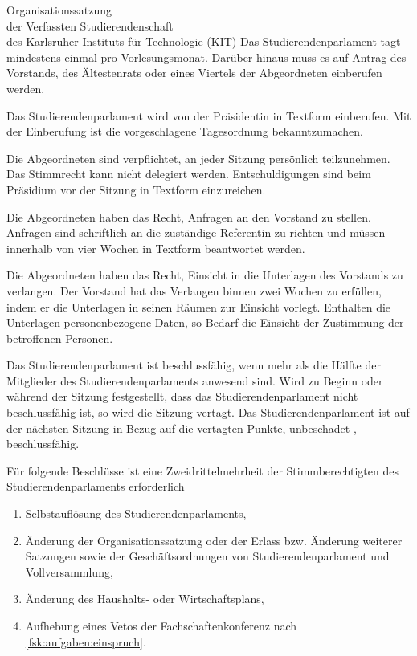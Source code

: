 \begin{jurdoc}[Organisationssatzung]{Organisationssatzung\\der Verfassten Studierendenschaft\\des Karlsruher Instituts für Technologie (KIT)}
Das Studierendenparlament tagt mindestens einmal pro Vorlesungsmonat. Darüber hinaus muss es auf Antrag des Vorstands, des Ältestenrats oder eines Viertels der Abgeordneten einberufen werden.

Das Studierendenparlament wird von der Präsidentin in Textform einberufen. Mit der Einberufung ist die vorgeschlagene Tagesordnung bekanntzumachen.

Die Abgeordneten sind verpflichtet, an jeder Sitzung persönlich teilzunehmen. Das Stimmrecht kann nicht delegiert werden. Entschuldigungen sind beim Präsidium vor der Sitzung in Textform einzureichen.

Die Abgeordneten haben das Recht, Anfragen an den Vorstand zu stellen. Anfragen sind schriftlich an die zuständige Referentin zu richten und müssen innerhalb von vier Wochen in Textform beantwortet werden.

Die Abgeordneten haben das Recht, Einsicht in die Unterlagen des Vorstands zu verlangen. Der Vorstand hat das Verlangen binnen zwei Wochen zu erfüllen, indem er die Unterlagen in seinen Räumen zur Einsicht vorlegt. Enthalten die Unterlagen personenbezogene Daten, so Bedarf die Einsicht der Zustimmung der betroffenen Personen.


\label{stupa:beschluesse}

Das Studierendenparlament ist beschlussfähig, wenn mehr als die Hälfte der Mitglieder des Studierendenparlaments anwesend sind. Wird zu Beginn oder während der Sitzung festgestellt, dass das Studierendenparlament nicht beschlussfähig ist, so wird die Sitzung vertagt. Das Studierendenparlament ist auf der nächsten Sitzung in Bezug auf die vertagten Punkte, unbeschadet , beschlussfähig.

Für folgende Beschlüsse ist eine Zweidrittelmehrheit der Stimmberechtigten des Studierendenparlaments erforderlich \label{stupa:beschluesse:zweidrittel}
\begin{enumerate}
  \item Selbstauflösung des Studierendenparlaments,
  \item Änderung der Organisationssatzung oder der Erlass bzw. Änderung weiterer Satzungen sowie der Ge\-schäfts\-ord\-nungen von Studierendenparlament und Vollversammlung,
  \item Änderung des Haushalts- oder Wirtschaftsplans,
  \item Aufhebung eines Vetos der Fachschaftenkonferenz nach \ref{fsk:aufgaben:einspruch}.
\end{enumerate}



\end{jurdoc}
